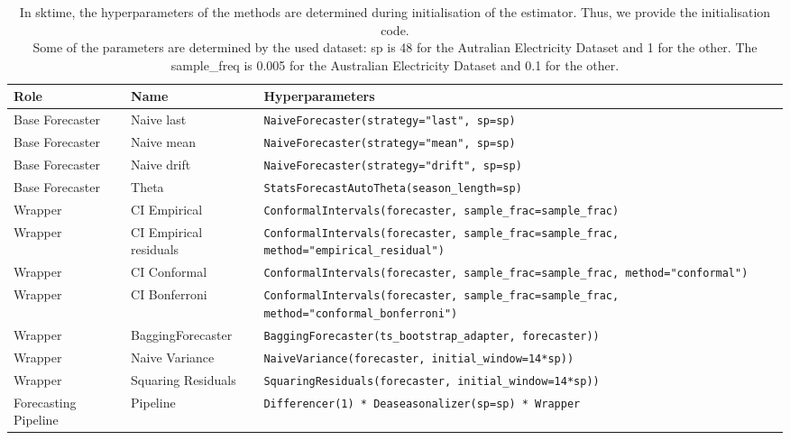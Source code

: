 \begin{table}[]
    \centering    \caption{
    In sktime, the hyperparameters of the methods are determined during initialisation of the estimator. Thus, we provide the initialisation code. \\
    Some of the parameters are determined by the used dataset: sp is 48 for the Autralian Electricity Dataset and 1 for the other. The sample\_freq is 0.005 for the Australian Electricity Dataset and 0.1 for the other.\\}
    \label{tab:hyperparams}
    \footnotesize
    \begin{tabular}{p{2.5cm}p{4cm}|p{7.5cm}}
    \toprule  
         Role & Name &  Hyperparameters \\ \midrule
         Base Forecaster & Naive last &  \texttt{NaiveForecaster(strategy="last", sp=sp)}\\
         Base Forecaster &  Naive mean &  \texttt{NaiveForecaster(strategy="mean", sp=sp)}\\
         Base Forecaster & Naive drift &  \texttt{NaiveForecaster(strategy="drift", sp=sp)}\\ 
         Base Forecaster & Theta &   \texttt{StatsForecastAutoTheta(season\_length=sp)} \\ \midrule
         Wrapper & CI Empirical & \texttt{ConformalIntervals(forecaster, sample\_frac=sample\_frac)} \\
         Wrapper & CI Empirical residuals & \texttt{ConformalIntervals(forecaster, sample\_frac=sample\_frac, method="empirical\_residual")} \\
         Wrapper & CI Conformal & \texttt{ConformalIntervals(forecaster, sample\_frac=sample\_frac, method="conformal")} \\
         Wrapper & CI Bonferroni & \texttt{ConformalIntervals(forecaster, sample\_frac=sample\_frac, method="conformal\_bonferroni")} \\
         Wrapper & BaggingForecaster & \texttt{BaggingForecaster(ts\_bootstrap\_adapter, forecaster))} \\
         Wrapper & Naive Variance & \texttt{NaiveVariance(forecaster, initial\_window=14*sp))}\\
         Wrapper & Squaring Residuals & \texttt{SquaringResiduals(forecaster, initial\_window=14*sp))}  \\ \midrule
         Forecasting Pipeline & Pipeline & \texttt{Differencer(1) * Deaseasonalizer(sp=sp) * Wrapper} \\ \midrule
        

\end{tabular}
\end{table}
